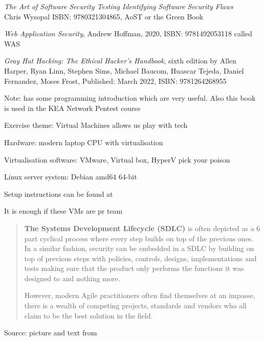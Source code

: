 \documentclass[Screen16to9,17pt]{foils}
\begin{document}


\emph{The Art of Software Security Testing Identifying Software Security Flaws}\\
Chris Wysopal ISBN: 9780321304865, AoST or the Green Book


\emph{Web Application Security}, Andrew Hoffman, 2020, ISBN: 9781492053118 called WAS




\emph{Gray Hat Hacking: The Ethical Hacker's Handbook}, sixth edition
by Allen Harper, Ryan Linn, Stephen Sims, Michael Baucom, Huascar Tejeda, Daniel Fernandez, Moses Frost, Published: March 2022, ISBN: 9781264268955

Note: has some programming introduction which are very useful.
Also this book is used in the KEA Network Pentest course




Exercise theme: Virtual Machines allows us play with tech


\begin{list2}
\item Hardware: modern laptop CPU with virtualisation
\item Virtualisation software: VMware, Virtual box, HyperV pick your poison
\item Linux server system: Debian amd64 64-bit 
\item Setup instructions can be found at 
\end{list2}

\centerline{It is enough if these VMs are pr team}




\begin{quote}\small
{\bf The Systems Development Lifecycle (SDLC)} is often depicted as a 6 part cyclical process where every step builds on top of the previous ones. In a similar fashion, security can be embedded in a SDLC by building on top of previous steps with policies, controls, designs, implementations and tests making sure that the product only performs the functions it was designed to and nothing more.

However, modern Agile practitioners often find themselves at an impasse, there is a wealth of competing projects, standards and vendors who all claim to be the best solution in the field.
\end{quote}
Source: picture and text from 
\end{document}
